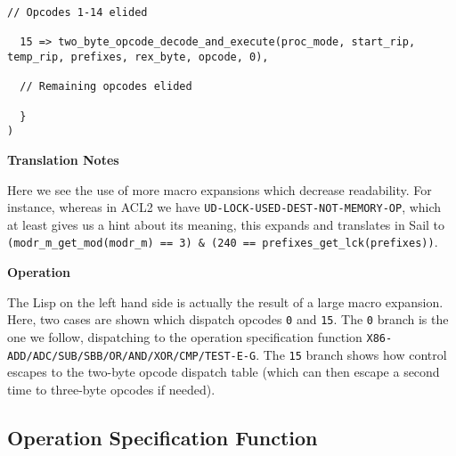 \documentclass[a4paper]{article}
\begin{document}
\begin{tcolorbox}[breakable]
\begin{parcolumns}{2}
{\begin{lstlisting}[language=sail]
  // Opcodes 1-14 elided

  15 => two_byte_opcode_decode_and_execute(proc_mode, start_rip, temp_rip, prefixes, rex_byte, opcode, 0),

  // Remaining opcodes elided

  }
)
\end{lstlisting}
}
\colplacechunks
\end{parcolumns}

\textbf{Translation Notes}

Here we see the use of more macro expansions which decrease readability.  For instance, whereas in ACL2 we have \texttt{UD-LOCK-USED-DEST-NOT-MEMORY-OP}, which at least gives us a hint about its meaning, this expands and translates in Sail to \texttt{(modr\_m\_get\_mod(modr\_m) == 3) \& (240 == prefixes\_get\_lck(prefixes))}.

\textbf{Operation}

The Lisp on the left hand side is actually the result of a large macro expansion.  Here, two cases are shown which dispatch opcodes \texttt{0} and \texttt{15}.  The \texttt{0} branch is the one we follow, dispatching to the operation specification function \texttt{X86-ADD/ADC/SUB/SBB/OR/AND/XOR/CMP/TEST-E-G}.  The \texttt{15} branch shows how control escapes to the two-byte opcode dispatch table (which can then escape a second time to three-byte opcodes if needed).

\end{tcolorbox}

\subsection{Operation Specification Function}
\end{document}
